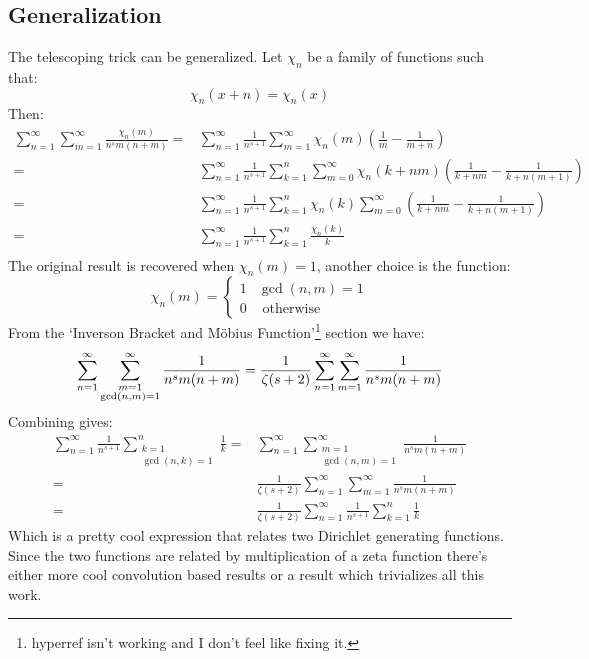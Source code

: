 \subsection{Generalization}
The telescoping trick can be generalized.
Let $\chi_n$ be a family of functions such that:
\[\chi_n(x+n)=\chi_n(x)\]
Then:
\begin{equation*}
\begin{aligned}
	\sum_{n=1}^\infty\sum_{m=1}^\infty\frac{\chi_n(m)}{n^sm(n+m)} =& \sum_{n=1}^\infty\frac{1}{n^{s+1}}\sum_{m=1}^\infty\chi_n(m)\left(\frac{1}{m}-\frac{1}{m+n}\right)\\
	=& \sum_{n=1}^\infty\frac{1}{n^{s+1}}\sum_{k=1}^n\sum_{m=0}^\infty\chi_n(k+nm)\left(\frac{1}{k+nm}-\frac{1}{k+n(m+1)}\right)\\
	=& \sum_{n=1}^\infty\frac{1}{n^{s+1}}\sum_{k=1}^n\chi_n(k)\sum_{m=0}^\infty\left(\frac{1}{k+nm}-\frac{1}{k+n(m+1)}\right)\\
	=& \sum_{n=1}^\infty\frac{1}{n^{s+1}}\sum_{k=1}^n\frac{\chi_n(k)}{k}\\
\end{aligned}
\end{equation*}
The original result is recovered when $\chi_n(m)=1$,
another choice is the function:
\[\chi_n(m)=\begin{cases}1&\gcd(n,m)=1\\0&\text{ otherwise}\end{cases}\]
From the `Inverson Bracket and Möbius Function'\footnote{hyperref isn't working and I don't feel like fixing it.} section we have:
\[\sum_{n=1}^\infty\sum_{\substack{m=1\\\gcd(n,m)=1}}^\infty\frac{1}{n^sm(n+m)}\\= \frac{1}{\zeta(s+2)}\sum_{n=1}^\infty\sum_{m=1}^\infty\frac{1}{n^sm(n+m)}\]
Combining gives:
\begin{equation*}
\begin{aligned}
	\sum_{n=1}^\infty\frac{1}{n^{s+1}}\sum_{\substack{k=1\\\gcd(n,k)=1}}^n\frac{1}{k}
	=& \sum_{n=1}^\infty\sum_{\substack{m=1\\\gcd(n,m)=1}}^\infty\frac{1}{n^sm(n+m)}\\
	=& \frac{1}{\zeta(s+2)}\sum_{n=1}^\infty\sum_{m=1}^\infty\frac{1}{n^sm(n+m)}\\
	=& \frac{1}{\zeta(s+2)}\sum_{n=1}^\infty\frac{1}{n^{s+1}}\sum_{k=1}^n\frac{1}{k}
\end{aligned}
\end{equation*}
Which is a pretty cool expression that relates two Dirichlet generating functions.
Since the two functions are related by multiplication of a zeta function there's either more cool convolution based results or a result which trivializes all this work.

